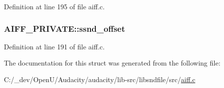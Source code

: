 Definition at line 195 of file aiff.\+c.

\subsubsection[{\texorpdfstring{ssnd\+\_\+offset}{ssnd_offset}}]{ A\+I\+F\+F\+\_\+\+P\+R\+I\+V\+A\+T\+E\+::ssnd\+\_\+offset}\hypertarget{struct_a_i_f_f___p_r_i_v_a_t_e_a3431a71b82f61768335ede9d964d5b9b}{}\label{struct_a_i_f_f___p_r_i_v_a_t_e_a3431a71b82f61768335ede9d964d5b9b}


Definition at line 191 of file aiff.\+c.



The documentation for this struct was generated from the following file\+:\begin{DoxyCompactItemize}
\item 
C\+:/\+\_\+dev/\+Open\+U/\+Audacity/audacity/lib-\/src/libsndfile/src/\hyperlink{aiff_8c}{aiff.\+c}\end{DoxyCompactItemize}
